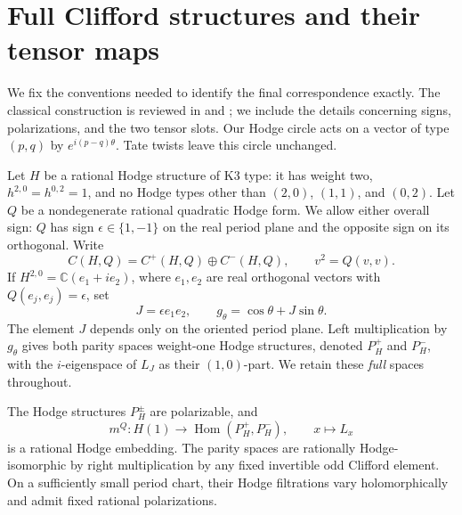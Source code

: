 \section{Full Clifford structures and their tensor maps}\label{cliff:section}

We fix the conventions needed to identify the final correspondence exactly.
The classical construction is reviewed in
\cite[Chapter~4, \S2]{Huybrechts} and \cite[\S\S5--6]{vanGeemen}; we
include the details concerning signs, polarizations, and the two tensor slots.
Our Hodge circle acts on a vector of type $(p,q)$ by
$e^{i(p-q)\theta}$. Tate twists leave this circle unchanged.

Let $H$ be a rational Hodge structure of K3 type: it has weight two,
$h^{2,0}=h^{0,2}=1$, and no Hodge types other than $(2,0)$, $(1,1)$,
and $(0,2)$. Let $Q$ be a
nondegenerate rational quadratic Hodge form. We allow either overall sign:
$Q$ has sign $\epsilon\in\{1,-1\}$ on the real period plane and the
opposite sign on its orthogonal. Write
\[
 C(H,Q)=C^+(H,Q)\oplus C^-(H,Q),\qquad v^2=Q(v,v).
\]
If $H^{2,0}=\mathbb C(e_1+i e_2)$, where $e_1,e_2$ are real orthogonal
vectors with $Q(e_j,e_j)=\epsilon$, set
\begin{equation}\label{cliff:circle}
 J=\epsilon e_1e_2,\qquad
 g_\theta=\cos\theta+J\sin\theta.
\end{equation}
The element $J$ depends only on the oriented period plane. Left
multiplication by $g_\theta$ gives both parity spaces weight-one Hodge
structures, denoted $P_H^+$ and $P_H^-$, with the $i$-eigenspace of $L_J$
as their $(1,0)$-part. We retain these \emph{full} spaces throughout.

\begin{proposition}\label{cliff:construction}
The Hodge structures $P_H^\pm$ are polarizable, and
\begin{equation}\label{cliff:multiplication}
 m^Q:H(1)\longrightarrow\operatorname{Hom}(P_H^+,P_H^-),
 \qquad x\longmapsto L_x
\end{equation}
is a rational Hodge embedding. The parity spaces are rationally
Hodge-isomorphic by right multiplication by any fixed invertible odd
Clifford element. On a sufficiently small period chart, their Hodge
filtrations vary holomorphically and admit fixed rational polarizations.
\end{proposition}

